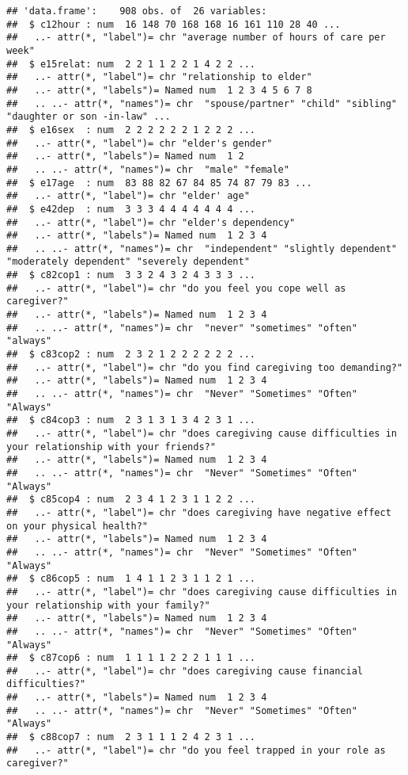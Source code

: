 \documentclass[]{article}
\begin{document}
\begin{verbatim}
## 'data.frame':    908 obs. of  26 variables:
##  $ c12hour : num  16 148 70 168 168 16 161 110 28 40 ...
##   ..- attr(*, "label")= chr "average number of hours of care per week"
##  $ e15relat: num  2 2 1 1 2 2 1 4 2 2 ...
##   ..- attr(*, "label")= chr "relationship to elder"
##   ..- attr(*, "labels")= Named num  1 2 3 4 5 6 7 8
##   .. ..- attr(*, "names")= chr  "spouse/partner" "child" "sibling" "daughter or son -in-law" ...
##  $ e16sex  : num  2 2 2 2 2 2 1 2 2 2 ...
##   ..- attr(*, "label")= chr "elder's gender"
##   ..- attr(*, "labels")= Named num  1 2
##   .. ..- attr(*, "names")= chr  "male" "female"
##  $ e17age  : num  83 88 82 67 84 85 74 87 79 83 ...
##   ..- attr(*, "label")= chr "elder' age"
##  $ e42dep  : num  3 3 3 4 4 4 4 4 4 4 ...
##   ..- attr(*, "label")= chr "elder's dependency"
##   ..- attr(*, "labels")= Named num  1 2 3 4
##   .. ..- attr(*, "names")= chr  "independent" "slightly dependent" "moderately dependent" "severely dependent"
##  $ c82cop1 : num  3 3 2 4 3 2 4 3 3 3 ...
##   ..- attr(*, "label")= chr "do you feel you cope well as caregiver?"
##   ..- attr(*, "labels")= Named num  1 2 3 4
##   .. ..- attr(*, "names")= chr  "never" "sometimes" "often" "always"
##  $ c83cop2 : num  2 3 2 1 2 2 2 2 2 2 ...
##   ..- attr(*, "label")= chr "do you find caregiving too demanding?"
##   ..- attr(*, "labels")= Named num  1 2 3 4
##   .. ..- attr(*, "names")= chr  "Never" "Sometimes" "Often" "Always"
##  $ c84cop3 : num  2 3 1 3 1 3 4 2 3 1 ...
##   ..- attr(*, "label")= chr "does caregiving cause difficulties in your relationship with your friends?"
##   ..- attr(*, "labels")= Named num  1 2 3 4
##   .. ..- attr(*, "names")= chr  "Never" "Sometimes" "Often" "Always"
##  $ c85cop4 : num  2 3 4 1 2 3 1 1 2 2 ...
##   ..- attr(*, "label")= chr "does caregiving have negative effect on your physical health?"
##   ..- attr(*, "labels")= Named num  1 2 3 4
##   .. ..- attr(*, "names")= chr  "Never" "Sometimes" "Often" "Always"
##  $ c86cop5 : num  1 4 1 1 2 3 1 1 2 1 ...
##   ..- attr(*, "label")= chr "does caregiving cause difficulties in your relationship with your family?"
##   ..- attr(*, "labels")= Named num  1 2 3 4
##   .. ..- attr(*, "names")= chr  "Never" "Sometimes" "Often" "Always"
##  $ c87cop6 : num  1 1 1 1 2 2 2 1 1 1 ...
##   ..- attr(*, "label")= chr "does caregiving cause financial difficulties?"
##   ..- attr(*, "labels")= Named num  1 2 3 4
##   .. ..- attr(*, "names")= chr  "Never" "Sometimes" "Often" "Always"
##  $ c88cop7 : num  2 3 1 1 1 2 4 2 3 1 ...
##   ..- attr(*, "label")= chr "do you feel trapped in your role as caregiver?"

\end{verbatim}
\end{document}
